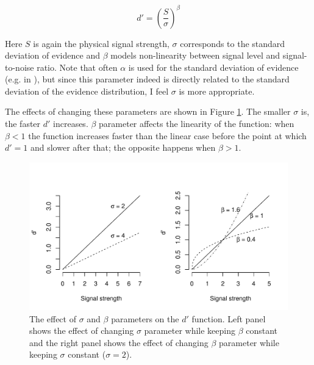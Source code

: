 \documentclass{article}\usepackage{knitr}
\begin{document}
\begin{equation}
d' = (\frac{S}{\sigma})^\beta
\label{eq:dprimefunc}
\end{equation}

Here $S$ is again the physical signal strength, $\sigma$ corresponds to the standard deviation of evidence and $\beta$ models non-linearity between signal level and signal-to-noise ratio. Note that often $\alpha$ is used for the standard deviation of evidence (e.g. in \cite{dai2011, kontsevichtyler1999}), but since this parameter indeed is directly related to the standard deviation of the evidence distribution, I feel $\sigma$ is more appropriate. 

The effects of changing these parameters are shown in Figure \ref{fig:dprimefunc}. The smaller $\sigma$ is, the faster $d'$ increases. $\beta$ parameter affects the linearity of the function: when $\beta < 1$ the function increases faster than the linear case before the point at which $d' = 1$ and slower after that; the opposite happens when $\beta > 1$. 

\begin{figure}[!htb]
\begin{center}
\begin{knitrout}
\color{fgcolor}
\includegraphics[width=\maxwidth]{figure/unnamed-chunk-3-1} 

\end{knitrout}
\end{center}
\caption{ The effect of $\sigma$ and $\beta$ parameters on the $d'$ function. Left panel shows the effect of changing $\sigma$ parameter while keeping $\beta$ constant and the right panel shows the effect of changing $\beta$ parameter while keeping $\sigma$ constant ($\sigma = 2$).}
\label{fig:dprimefunc}
\end{figure}
\end{document}
